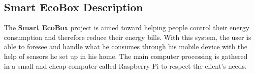 
\subsection{Smart EcoBox Description}
%
%


The \textbf{Smart EcoBox} project is aimed toward helping people control their energy consumption and therefore reduce their energy bills. With this system, the user is able to foresee and handle what he consumes through his mobile device with the help of sensors he set up in his home. The main computer processing is gathered in a small and cheap computer called Raspberry Pi to respect the client's needs.


